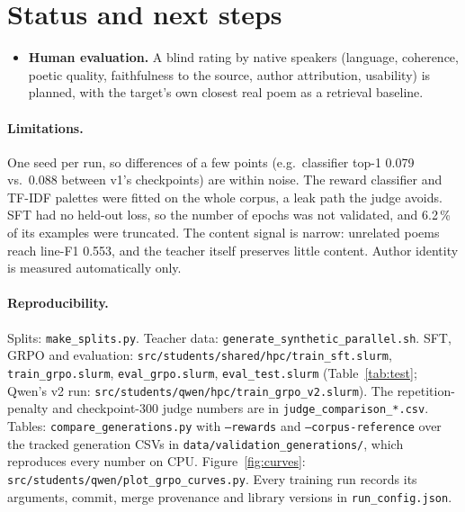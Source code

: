 \documentclass[11pt]{article}
\begin{document}
\section{Status and next steps}\label{sec:next}

\begin{itemize}\itemsep2pt
  \item \textbf{Human evaluation.} A blind rating by native speakers
    (language, coherence, poetic quality, faithfulness to the source, author
    attribution, usability) is planned, with the target's own closest real
    poem as a retrieval baseline.
\end{itemize}

\paragraph{Limitations.} One seed per run, so differences of a few points
(e.g.\ classifier top-1 0.079 vs.\ 0.088 between v1's checkpoints) are within
noise. The reward classifier and TF-IDF palettes were fitted on the whole
corpus, a leak path the judge avoids. SFT had no held-out loss, so the number
of epochs was not validated, and 6.2\,\% of its examples were truncated. The
content signal is narrow: unrelated poems reach line-F1 0.553, and the teacher
itself preserves little content. Author identity is measured automatically
only.

{\raggedright\paragraph{Reproducibility.} Splits: \texttt{make\_splits.py}. Teacher data:
\texttt{generate\_synthetic\_parallel.sh}. SFT, GRPO and evaluation:
\texttt{src/students/shared/hpc/train\_sft.slurm}, \texttt{train\_grpo.slurm},
\texttt{eval\_grpo.slurm}, \texttt{eval\_test.slurm}
(Table~\ref{tab:test}; Qwen's v2 run: \texttt{src/students/qwen/hpc/train\_grpo\_v2.slurm}). The repetition-penalty and
checkpoint-300 judge numbers are in
\texttt{judge\_comparison\_*.csv}. Tables:
\texttt{compare\_generations.py} with \texttt{--rewards} and
\texttt{--corpus-reference} over the tracked
generation CSVs in \texttt{data/validation\_generations/}, which reproduces
every number on CPU. Figure~\ref{fig:curves}:
\texttt{src/students/qwen/plot\_grpo\_curves.py}. Every training run records its
arguments, commit, merge provenance and library versions in
\texttt{run\_config.json}.\par}
\end{document}
